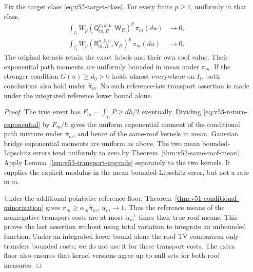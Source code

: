\begin{theorem}
\label{thm:v53-same-roof-Wp}
Fix the target class \eqref{eq:v52-target-class}. For every finite
$p\ge1$, uniformly in that class,
\begin{align}
 \int_{I_t}W_p(\mathsf Q_{m,R}^{n,k,u},\mathsf W_R)^p\,\pi_m(du)&\to0,
                                      \label{eq:v53-collision-Wp}\\
 \int_{I_t}W_p(\mathsf R_{m,R}^{n,k,u},\mathsf V_R)^p\,\pi_m(du)&\to0.
                                      \label{eq:v53-return-Wp}
\end{align}
The original kernels retain the exact labels and their own roof value.
Their exponential path moments are uniformly bounded in mean under
$\pi_m$. If the stronger condition $G(u)\ge d_0>0$ holds almost
everywhere on $I_t$, both conclusions also hold under
$\widehat\pi_m$. No such reference-law transport assertion is made
under the integrated reference lower bound alone.
\end{theorem}
\begin{proof}
The true event has $F_m=\int_{I_t}P\ge dh/2$ eventually.
Dividing \eqref{eq:v53-return-exponential} by $F_m/h$ gives the
uniform exponential moment of the conditional path mixture under
$\pi_m$, and hence of the same-roof kernels in mean. Gaussian bridge
exponential moments are uniform as above. The two mean
bounded-Lipschitz errors tend uniformly to zero by
Theorem~\ref{thm:v52-same-roof-mean}. Apply
Lemma~\ref{lem:v53-transport-upgrade} separately to the two kernels.
It supplies the explicit modulus in the mean bounded-Lipschitz
error, but not a rate in $m$.

Under the additional pointwise reference floor,
Theorem~\ref{thm:v51-conditional-minorization} gives
$\pi_m\ge\alpha_m\widehat\pi_m$, $\alpha_m\to1$.
Thus the reference means of the nonnegative transport costs are at
most $\alpha_m^{-1}$ times their true-roof means. This proves the
last assertion without using total variation to integrate an
unbounded function. Under an integrated lower bound alone the roof
TV comparison only transfers bounded costs; we do not use it for
these transport costs. The extra floor also ensures that kernel
versions agree up to null sets for both roof measures.
\end{proof}

